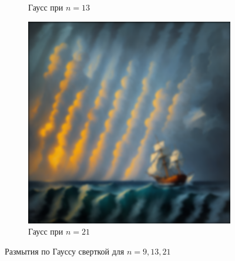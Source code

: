 \documentclass[a4paper, 12pt]{article}
\begin{document}
\begin{figure}[H]
\begin{subfigure}{0.30\textwidth}
            \caption{Гаусс при $n=13$}
            \label{fig:g_c2_n=13}
        \end{subfigure}
        \begin{subfigure}{0.30\textwidth}
            \centering
            \includegraphics[width=\linewidth]{g_c2_n=21.png}
            \caption{Гаусс при $n=21$}
            \label{fig:g_c2_n=21}
        \end{subfigure}
        \caption{Размытия по Гауссу сверткой для $n=9,13,21$}
        \label{fig:gcls}
    \end{figure}
\end{document}
